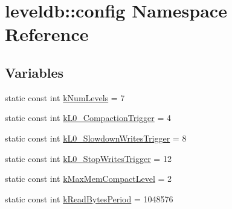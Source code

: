 \hypertarget{namespaceleveldb_1_1config}{\section{leveldb\-:\-:config Namespace Reference}
\label{namespaceleveldb_1_1config}
}
\subsection*{Variables}
\begin{DoxyCompactItemize}
\item 
static const int \hyperlink{namespaceleveldb_1_1config_ab6017947ae68898c606643bddc0f5b9c}{k\-Num\-Levels} = 7
\item 
static const int \hyperlink{namespaceleveldb_1_1config_adfd6a021e9c77747ec38714c45ef017e}{k\-L0\-\_\-\-Compaction\-Trigger} = 4
\item 
static const int \hyperlink{namespaceleveldb_1_1config_a95d0f42e5c266f803d0ab649a0a1929e}{k\-L0\-\_\-\-Slowdown\-Writes\-Trigger} = 8
\item 
static const int \hyperlink{namespaceleveldb_1_1config_a5541eb2b38aa4cd4046e8f2c714525ec}{k\-L0\-\_\-\-Stop\-Writes\-Trigger} = 12
\item 
static const int \hyperlink{namespaceleveldb_1_1config_a430b64b6904a624a515357cdfadba700}{k\-Max\-Mem\-Compact\-Level} = 2
\item 
static const int \hyperlink{namespaceleveldb_1_1config_a95c3d6a12072502a6b94bf3a412e714f}{k\-Read\-Bytes\-Period} = 1048576
\end{DoxyCompactItemize}


